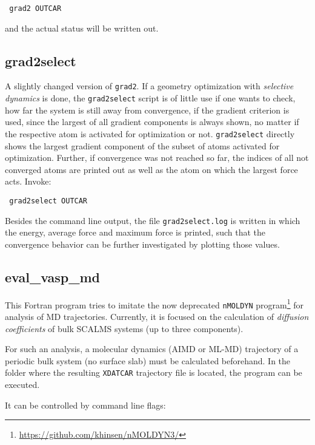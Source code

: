 \documentclass[a4paper,11pt]{article}
\begin{document}
\begin{verbatim}
 grad2 OUTCAR
\end{verbatim}

and the actual status will be written out.


\subsection{grad2select}\label{grad2select}

A slightly changed version of \texttt{grad2}. If a geometry optimization with \textit{selective dynamics}
is done, the \texttt{grad2select} script is of little use if one wants to check, how far the 
system is still away from convergence, if the gradient criterion is used, since 
the largest of all gradient components is always shown, no matter if the respective 
atom is activated for optimization or not.
\texttt{grad2select} directly shows the largest gradient component of the subset of atoms 
activated for optimization.
Further, if convergence was not reached so far, the indices of all not converged atoms are printed 
out as well as the atom on which the largest force acts.
Invoke:

\begin{verbatim}
 grad2select OUTCAR
\end{verbatim}

Besides the command line output, the file \texttt{grad2select.log} is written in which
the energy, average force and maximum force is printed, such that the 
convergence behavior can be further investigated by plotting those values.

\subsection{eval\_vasp\_md}\label{eval_vasp_md}

This Fortran program tries to imitate the now deprecated \texttt{nMOLDYN} 
program\footnote{\url{https://github.com/khinsen/nMOLDYN3/}} for analysis
of MD trajectories.
Currently, it is focused on the calculation of \textit{diffusion coefficients} 
of bulk SCALMS systems (up to three components).

For such an analysis, a molecular dynamics (AIMD or ML-MD) trajectory
of a periodic bulk system (no surface slab) must be calculated beforehand.
In the folder where the resulting \texttt{XDATCAR} trajectory file
is located, the program can be executed.

It can be controlled by command line flags:
\end{document}
